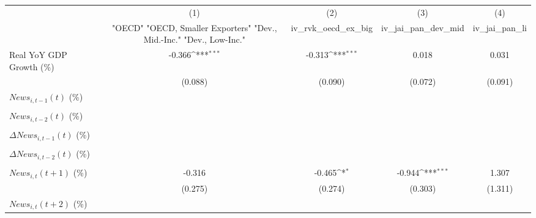 {
\def\sym#1{\ifmmode^{#1}\else\(^{#1}\)\fi}
\begin{tabular}{l*{4}{c}}
\toprule
                    &\multicolumn{1}{c}{(1)}&\multicolumn{1}{c}{(2)}&\multicolumn{1}{c}{(3)}&\multicolumn{1}{c}{(4)}\\
                    &\multicolumn{1}{c}{ "OECD" "OECD, Smaller Exporters" "Dev., Mid.-Inc." "Dev., Low-Inc."}&\multicolumn{1}{c}{iv_rvk_oecd_ex_big}&\multicolumn{1}{c}{iv_jai_pan_dev_mid}&\multicolumn{1}{c}{iv_jai_pan_li}\\
\midrule
Real YoY GDP Growth (\%)&      -0.366\sym{***}&      -0.313\sym{***}&       0.018         &       0.031         \\
                    &     (0.088)         &     (0.090)         &     (0.072)         &     (0.091)         \\
\addlinespace
$ News_{i,t-1}(t)$ (\%)&                     &                     &                     &                     \\
                    &                     &                     &                     &                     \\
\addlinespace
$ News_{i,t-2}(t)$ (\%)&                     &                     &                     &                     \\
                    &                     &                     &                     &                     \\
\addlinespace
$ \Delta News_{i,t-1}(t)$ (\%)&                     &                     &                     &                     \\
                    &                     &                     &                     &                     \\
\addlinespace
$ \Delta News_{i,t-2}(t)$ (\%)&                     &                     &                     &                     \\
                    &                     &                     &                     &                     \\
\addlinespace
$ News_{i,t}(t+1)$ (\%)&      -0.316         &      -0.465\sym{*}  &      -0.944\sym{***}&       1.307         \\
                    &     (0.275)         &     (0.274)         &     (0.303)         &     (1.311)         \\
\addlinespace
$ News_{i,t}(t+2)$ (\%)&                     &                     &                     &                     \\

\end{tabular}}

